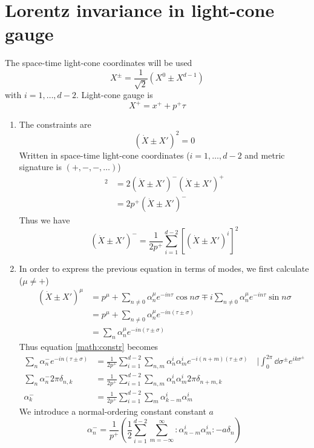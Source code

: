 \section{Lorentz invariance in light-cone gauge}
The space-time light-cone coordinates will be used
\begin{equation}
	X^\pm = \frac{1}{\sqrt{2}} \left( X^0 \pm X^{d-1} \right)
\end{equation}
with $i=1,\dots,d-2$. Light-cone gauge is
\begin{equation}
	X^+ = x^+ + p^+ \tau
\end{equation}

\begin{enumerate}[label=(\alph*)]
	\item The constraints are
		\begin{equation}
			( \dot{X} \pm X' )^2 = 0
		\end{equation}
		Written in space-time light-cone coordinates ($i=1,\dots,d-2$ and metric signature is $(+,-,-,\dots)$)
		\begin{align*}
			[( \dot{X} \pm X' )^i]^2  &= 2 ( \dot{X} \pm X' )^- ( \dot{X} \pm X' )^+ \\
											  &= 2 p^+ ( \dot{X} \pm X' )^-
		\end{align*}
		Thus we have
		\begin{equation}
			( \dot{X} \pm X' )^- = \frac{1}{2p^+} \sum_{i=1}^{d-2} [( \dot{X} \pm X' )^i]^2
			\label{math:constr}
		\end{equation}

	\item  In order to express the previous equation in terms of modes, we first calculate ($\mu \neq +$)
		\begin{align*}
			( \dot{X} \pm X' )^\mu &= p^\mu + \sum_{n\neq 0 } \alpha^\mu_n e^{-in\tau} \cos n\sigma \mp i \sum_{n\neq 0} \alpha^\mu_n e^{-in\tau} \sin n \sigma \\
										  &= p^\mu + \sum_{n\neq 0 } \alpha^\mu_n e^{-in (\tau \pm \sigma)}  \\
										  &= \sum_{n} \alpha^\mu_n e^{-in (\tau \pm \sigma)}
		\end{align*}
		Thus equation \eqref{math:constr} becomes
		\begin{align*}
			\sum_{n} \alpha^-_n e^{-in (\tau \pm \sigma)} &= \frac{1}{2p^+} \sum_{i=1}^{d-2} \sum_{n,m}\alpha^i_n \alpha^i_m  e^{-i (n+m) (\tau \pm \sigma)} \quad | \int_0^{2\pi} \dd{\sigma^\pm} e^{ik \sigma^\pm} \\
			\sum_n \alpha^-_n 2\pi \delta_{n,k} &= \frac{1}{2p^+} \sum_{i=1}^{d-2} \sum_{n,m}\alpha^i_n \alpha^i_m 2\pi \delta_{n+m, k} \\
			\alpha^-_{k} &= \frac{1}{2p^+} \sum_{i=1}^{d-2} \sum_{m}\alpha^i_{k-m} \alpha^i_m
		\end{align*}
		We introduce a normal-ordering constant constant $a$
		\begin{equation}
			\alpha^-_{n} = \frac{1}{p^+} \left( \frac{1}{2}\sum_{i=1}^{d-2} \sum_{m=-\infty}^{\infty} :\alpha^i_{n-m} \alpha^i_m:   - a \delta_n \right)
		\end{equation}


\end{enumerate}
